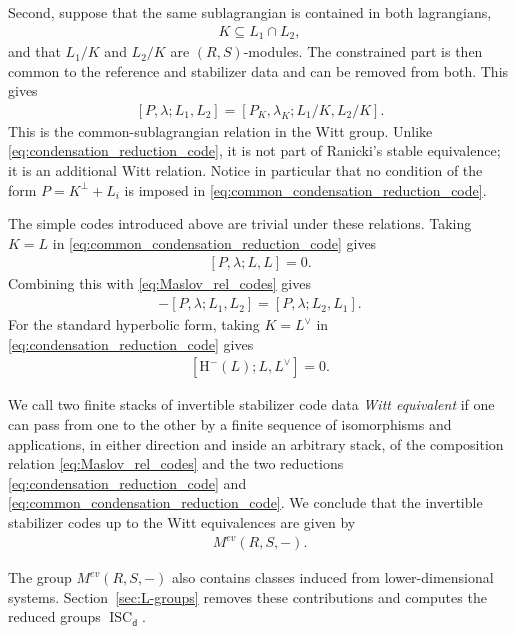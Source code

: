 \documentclass[sn-mathphys-num]{sn-jnl}
\theoremstyle{definition}
\numberwithin{equation}{section}
\theoremstyle{definition}
\def\hm{{\mbox{H}}^{-}}
\def\l{{\lambda}}
\newcommand{\dd}{{\mathsf{d}}} %
\begin{document}
Second, suppose that the same sublagrangian is contained in both
lagrangians,
\begin{align}
    K\subseteq L_1\cap L_2,
\end{align}
and that $L_1/K$ and $L_2/K$ are $(R,S)$-modules. The constrained part is
then common to the reference and stabilizer data and can be removed from
both. This gives
\begin{align}\label{eq:common_condensation_reduction_code}
    [P,\l;L_1,L_2]
    =
    [P_K,\l_K;L_1/K,L_2/K].
\end{align}
This is the common-sublagrangian relation in the Witt group. Unlike
\eqref{eq:condensation_reduction_code}, it is not part of Ranicki's stable
equivalence; it is an additional Witt relation. Notice in particular that no
condition of the form $P=K^{\perp}+L_i$ is imposed in
\eqref{eq:common_condensation_reduction_code}.

The simple codes introduced above are trivial under these relations. Taking
$K=L$ in \eqref{eq:common_condensation_reduction_code} gives
\begin{align}\label{eq:diagonal_simple_code_trivial}
    [P,\l;L,L]=0.
\end{align}
Combining this with \eqref{eq:Maslov_rel_codes} gives
\begin{align}\label{eq:inverse_code_formation}
    -[P,\l;L_1,L_2]
    =
    [P,\l;L_2,L_1].
\end{align}
For the standard hyperbolic form, taking $K=L^{\vee}$ in
\eqref{eq:condensation_reduction_code} gives
\begin{align}\label{eq:fourier_simple_code_trivial}
    [\hm(L);L,L^\vee]=0.
\end{align}

We call two finite stacks of invertible stabilizer code data \textit{Witt
equivalent} if one can pass from one to the other by a finite sequence of
isomorphisms and applications, in either direction and inside an arbitrary
stack, of the composition relation \eqref{eq:Maslov_rel_codes} and the two
reductions \eqref{eq:condensation_reduction_code} and
\eqref{eq:common_condensation_reduction_code}. We conclude that the invertible stabilizer codes up to the Witt equivalences are given by 
\begin{align}
    M^{ev}(R,S,-).
\end{align}

 The group $M^{ev}(R,S,-)$ also contains classes induced from
lower-dimensional systems. Section~\ref{sec:L-groups} removes these
contributions and computes the reduced groups $\operatorname{ISC}_{\dd}$.
\end{document}
